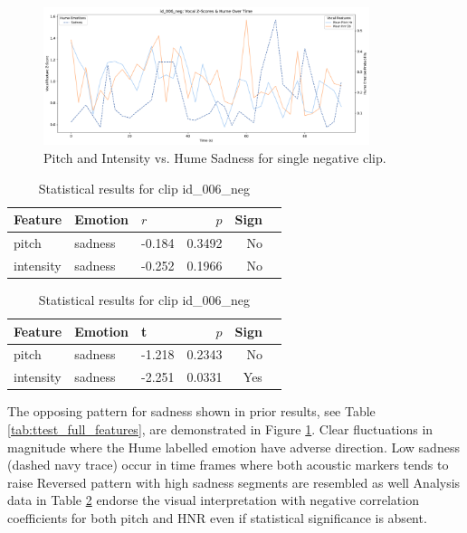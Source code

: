 \begin{figure}[H]
    \centering
    \includegraphics[width=0.85\textwidth]{png/results/rq1_nr3/combined_zscore_hume_id_006_neg_7.pdf}
    \caption{Pitch and Intensity vs. Hume Sadness for single negative clip.}
    \label{fig:006_neg-sadness}
\end{figure}
\begin{table}[H]
    \centering
    \begin{subtable}[t]{0.48\textwidth}
      \centering
      \caption{Clip id\_006\_neg – Pearson Correlation}
      \label{tab:clip006_neg_pearson}
      \begin{tabular}{lllrrl}
        \toprule
        Feature               & Emotion & $r$ & $p$ & Sign \\
        \midrule
        pitch       & sadness    &  -0.184 & 0.3492 & No  \\
        intensity    & sadness    & -0.252 & 0.1966 & No  \\
        \bottomrule
      \end{tabular}
    \end{subtable}
    \hfill
    \begin{subtable}[t]{0.48\textwidth}
      \centering
      \caption{Clip id\_006\_neg – t-test}
      \label{tab:clip006_neg_ttest}
      \begin{tabular}{lllrrl}
        \toprule
        Feature               & Emotion & t & $p$& Sign \\
        \midrule

        pitch       & sadness    &  -1.218 & 0.2343 & No  \\
        intensity    & sadness    & -2.251 & 0.0331 & Yes  \\
        \bottomrule
      \end{tabular}
    \end{subtable}
    \caption{Statistical results for clip id\_006\_neg}
    \label{tab:clip006_neg_stats}
  \end{table}

The opposing pattern for sadness shown in prior results, see Table \ref{tab:ttest_full_features},  are demonstrated in Figure \ref{fig:006_neg-sadness}. Clear fluctuations in magnitude where the Hume labelled emotion have adverse direction. 
Low sadness (dashed navy trace) occur in time frames where both acoustic markers tends to raise%
Reversed pattern with high sadness segments are resembled as well%
Analysis data in Table \ref{tab:clip006_neg_stats} endorse the visual interpretation with negative correlation coefficients for both pitch and HNR even if statistical significance is absent. 


